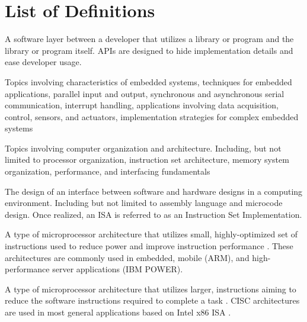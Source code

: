 
\chapter*{List of Definitions}

\begin{definition}
    A software layer between a developer that utilizes a library or program and the library or program itself. APIs are designed to hide implementation details and ease developer usage.
\end{definition}

\begin{definition} 
	Topics involving characteristics of embedded systems, techniques for embedded applications, parallel input and output, synchronous and asynchronous serial communication, interrupt handling, applications involving data acquisition, control, sensors, and actuators, implementation strategies for complex embedded systems \cite[p.~118]{cec2016}
\end{definition}

\begin{definition} 
	Topics involving computer organization and architecture. Including, but not limited to processor organization, instruction set architecture, memory system organization, performance, and interfacing fundamentals \cite[p.~118]{cec2016}
\end{definition}

\begin{definition}
    The design of an interface between software and hardware designs in a computing environment. Including but not limited to assembly language and microcode design. Once realized, an ISA is referred to as an Instruction Set Implementation. 
\end{definition}

\begin{definition}
    A type of microprocessor architecture that utilizes small, highly-optimized set of instructions used to reduce power and improve instruction performance \cite{Aletan1992, Stokes1999}. These architectures are commonly used in embedded, mobile (ARM), and high-performance server applications (IBM POWER). 
\end{definition}

\begin{definition}
    A type of microprocessor architecture that utilizes larger, instructions aiming to reduce the software instructions required to complete a task \cite{Aletan1992, Stokes1999}. CISC architectures are used in most general applications based on Intel\textregistered{} x86 ISA \cite{intel2017}.
\end{definition}

